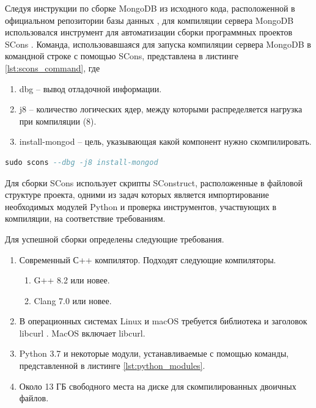 Следуя инструкции по сборке MongoDB из исходного кода, расположенной в официальном репозитории базы данных \cite{Instruction}, для компиляции сервера MongoDB использовался инструмент для автоматизации сборки программных проектов SCons \cite{SCons}. Команда, использовавшаяся для запуска компиляции сервера MongoDB в командной строке с помощью SCons, представлена в листинге \ref{lst:scons_command}, где 
\begin{enumerate}
\item dbg -- вывод отладочной информации.
\item j8 -- количество логических ядер, между которыми распределяется нагрузка при компиляции (8).
\item install-mongod -- цель, указывающая какой компонент нужно скомпилировать.
\end{enumerate}

\begin{lstlisting}[language=sql, label=some-code, caption=Команда для компиляции сервера MongoDB средствами SCons, label=lst:scons_command]
sudo scons --dbg -j8 install-mongod  
\end{lstlisting}

Для сборки SCons использует скрипты SConstruct, расположенные в файловой структуре проекта, одними из задач которых является импортирование необходимых модулей Python и проверка инструментов, участвующих в компиляции, на соответствие требованиям.

Для успешной сборки определены следующие требования.

\begin{enumerate}
\item Современный С++ компилятор. Подходят следующие компиляторы.
\begin{enumerate}
\item G++ 8.2 \cite{GCC} или новее.
\item Clang 7.0 \cite{Clang} или новее.
\end{enumerate}
\item В операционных системах Linux \cite{Linux} и macOS \cite{macOS} требуется библиотека и заголовок libcurl \cite{LibCurl}. MacOS включает libcurl.
\item Python 3.7 и некоторые модули, устанавливаемые с помощью команды, представленной в листинге \ref{lst:python_modules}.
\item Около 13 ГБ свободного места на диске для скомпилированных двоичных файлов.
\end{enumerate}

